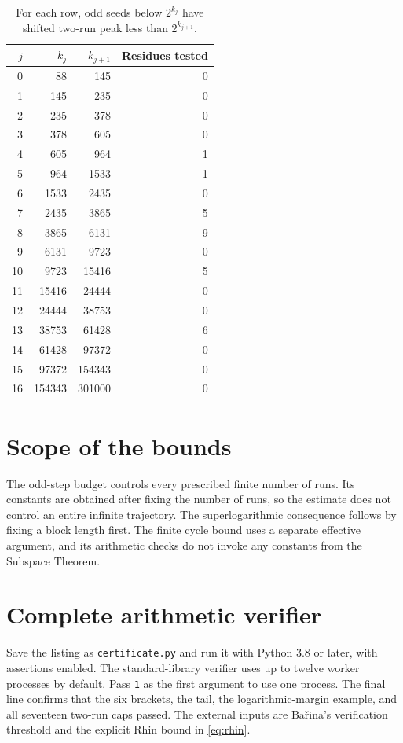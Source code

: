 \documentclass[11pt]{article}
\theoremstyle{definition}
\begin{document}
\begin{table}[htbp]
\centering
\begin{tabular}{@{}r rr r@{}}
\toprule
\(j\) & \(k_j\) & \(k_{j+1}\) & Residues tested\\
\midrule
0 & 88 & 145 & 0\\
1 & 145 & 235 & 0\\
2 & 235 & 378 & 0\\
3 & 378 & 605 & 0\\
4 & 605 & 964 & 1\\
5 & 964 & 1533 & 1\\
6 & 1533 & 2435 & 0\\
7 & 2435 & 3865 & 5\\
8 & 3865 & 6131 & 9\\
9 & 6131 & 9723 & 0\\
10 & 9723 & 15416 & 5\\
11 & 15416 & 24444 & 0\\
12 & 24444 & 38753 & 0\\
13 & 38753 & 61428 & 6\\
14 & 61428 & 97372 & 0\\
15 & 97372 & 154343 & 0\\
16 & 154343 & 301000 & 0\\
\bottomrule
\end{tabular}
\caption{For each row, odd seeds below \(2^{k_j}\) have shifted
two-run peak less than \(2^{k_{j+1}}\).}
\label{tab:caps}
\end{table}

\section{Scope of the bounds}

The odd-step budget controls every prescribed finite number of runs.
Its constants are obtained after fixing the number of runs, so the
estimate does not control an entire infinite trajectory. The
superlogarithmic consequence follows by fixing a block length first.
The finite cycle bound uses a separate effective argument, and its
arithmetic checks do not invoke any constants from the Subspace Theorem.

\appendix
\section{Complete arithmetic verifier}\label{app:code}

Save the listing as \texttt{certificate.py} and run it with Python
3.8 or later, with assertions enabled. The standard-library verifier
uses up to twelve worker processes by default. Pass \texttt{1} as the
first argument to use one process. The final line confirms that the
six brackets, the tail, the logarithmic-margin example, and all
seventeen two-run caps passed. The external inputs are
Ba\v{r}ina's verification threshold and the explicit Rhin bound
in \eqref{eq:rhin}.
\end{document}
